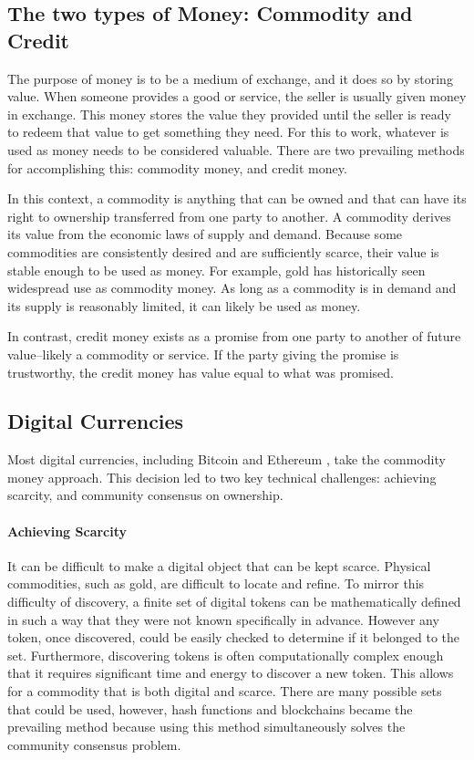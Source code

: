 \documentclass[runningheads]{llncs}
\begin{document}
\subsection{The two types of Money: Commodity and Credit}
The purpose of money is to be a medium of exchange, and it does so by storing value. When someone provides a good or service, the seller is usually given money in exchange. This money stores the value they provided until the seller is ready to redeem that value to get something they need.
For this to work, whatever is used as money needs to be considered valuable. There are two prevailing methods for accomplishing this: commodity money, and credit money. 

In this context, a commodity is anything that can be owned and that can have its right to ownership transferred from one party to another. A commodity derives its value from the economic laws of supply and demand. Because some commodities are consistently desired and are sufficiently scarce, their value is stable enough to be used as money. For example, gold has historically seen widespread use as commodity money. As long as a commodity is in demand and its supply is reasonably limited, it can likely be used as money.

In contrast, credit money exists as a promise from one party to another of future value--likely a commodity or service. If the party giving the promise is trustworthy, the credit money has value equal to what was promised.

\subsection{Digital Currencies}
Most digital currencies, including Bitcoin and Ethereum \cite{bitcoin}, take the commodity money approach. This decision led to two key technical challenges: achieving scarcity, and community consensus on ownership.

\paragraph{Achieving Scarcity}
It can be difficult to make a digital object that can be kept scarce.
Physical commodities, such as gold, are difficult to locate and refine. To mirror this difficulty of discovery, a finite set of digital tokens can be mathematically defined in such a way that they were not known specifically in advance. However any token, once discovered, could be easily checked to determine if it belonged to the set. Furthermore, discovering tokens is often computationally complex enough that it requires significant time and energy to discover a new token. This allows for a commodity that is both digital and scarce.
There are many possible sets that could be used, however, hash functions and blockchains became the prevailing method because using this method simultaneously solves the community consensus problem.
\end{document}
